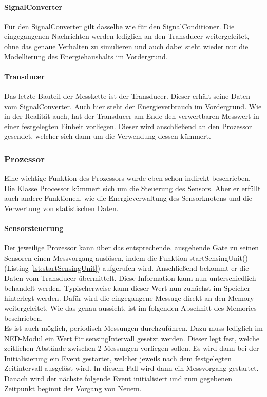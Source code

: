 \paragraph{SignalConverter}

Für den SignalConverter gilt dasselbe wie für den SignalConditioner. Die eingegangenen Nachrichten werden lediglich an den Transducer weitergeleitet, ohne das genaue Verhalten zu simulieren und auch dabei steht wieder nur die Modellierung des Energiehaushalts im Vordergrund. 

\paragraph{Transducer}

Das letzte Bauteil der Messkette ist der Transducer. Dieser erhält seine Daten vom SignalConverter. Auch hier steht der Energieverbrauch im Vordergrund. Wie in der Realität auch, hat der Transducer am Ende den verwertbaren Messwert in einer festgelegten Einheit vorliegen. Dieser wird anschließend an den Prozessor gesendet, welcher sich dann um die Verwendung dessen kümmert.

\subsubsection{Prozessor}

Eine wichtige Funktion des Prozessors wurde eben schon indirekt beschrieben. Die Klasse Processor kümmert sich um die Steuerung des Sensors. Aber er erfüllt auch andere Funktionen, wie die Energieverwaltung des Sensorknotens und die Verwertung von statistischen Daten.

\paragraph{Sensorsteuerung}

Der jeweilige Prozessor kann über das entsprechende, ausgehende Gate zu seinen Sensoren einen Messvorgang auslösen, indem die Funktion startSensingUnit() (Listing \ref{lst:startSensingUnit}) aufgerufen wird. Anschließend bekommt er die Daten vom Transducer übermittelt. Diese Information kann nun unterschiedlich behandelt werden. Typischerweise kann dieser Wert nun zunächst im Speicher hinterlegt werden. Dafür wird die eingegangene Message direkt an den Memory weitergeleitet. Wie das genau aussieht, ist im folgenden Abschnitt des Memories beschrieben.\\
Es ist auch möglich, periodisch Messungen durchzuführen. Dazu muss lediglich im NED-Modul ein Wert für sensingIntervall gesetzt werden. Dieser legt fest, welche zeitlichen Abstände zwischen 2 Messungen vorliegen sollen. Es wird dann bei der Initialisierung ein Event gestartet, welcher jeweils nach dem festgelegten Zeitintervall ausgelöst wird. In diesem Fall wird dann ein Messvorgang gestartet. Danach wird der nächste folgende Event initialisiert und zum gegebenen Zeitpunkt beginnt der Vorgang von Neuem.

